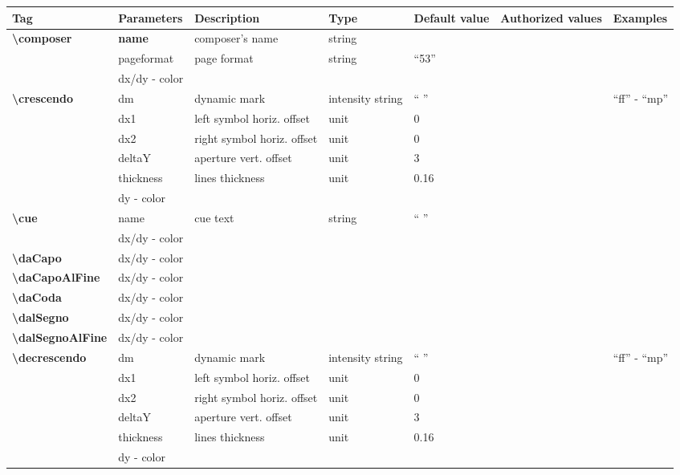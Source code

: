 \documentclass[a4paper, landscape, 10pt]{article}
\begin{document}
\begin{tabularx}{\linewidth}{p{3cm}p{3cm}p{5cm}p{3cm}p{2.5cm}p{3.5cm}p{4cm}}
    \hline
    \textbf{Tag}&\textbf{Parameters}&\textbf{Description}&\textbf{Type}&\textbf{Default value}&\textbf{Authorized values}&\textbf{Examples}\\
    \hline
    \textbf{\textbackslash{}composer}&\textbf{name}&composer's name&string&&&\\
    &pageformat&page format&string&``53''&&\\ %
    &dx/dy - color&&&&&\\
    \hline
    \textbf{\textbackslash{}crescendo}&dm&dynamic mark&intensity string&`` ''&&``ff'' - ``mp''\\
    &dx1&left symbol horiz. offset&unit&0&&\\
    &dx2&right symbol horiz. offset&unit&0&&\\
    &deltaY&aperture vert. offset&unit&3&&\\
    &thickness&lines thickness&unit&0.16&&\\
	&dy - color&&&&&\\
    \hline
    \textbf{\textbackslash{}cue}&name&cue text&string&`` ''&&\\
    &dx/dy - color&&&&&\\
    \hline
    \textbf{\textbackslash{}daCapo}&dx/dy - color&&&&&\\
    \hline
    \textbf{\textbackslash{}daCapoAlFine}&dx/dy - color&&&&&\\
    \hline
    \textbf{\textbackslash{}daCoda}&dx/dy - color&&&&&\\
    \hline
    \textbf{\textbackslash{}dalSegno}&dx/dy - color&&&&&\\
    \hline
    \textbf{\textbackslash{}dalSegnoAlFine}&dx/dy - color&&&&&\\
    \hline
    \textbf{\textbackslash{}decrescendo}&dm&dynamic mark&intensity string&`` ''&&``ff'' - ``mp''\\
    &dx1&left symbol horiz. offset&unit&0&&\\
    &dx2&right symbol horiz. offset&unit&0&&\\
    &deltaY&aperture vert. offset&unit&3&&\\
    &thickness&lines thickness&unit&0.16&&\\
    &dy - color&&&&&\\
    \hline

\end{tabularx}
\end{document}
